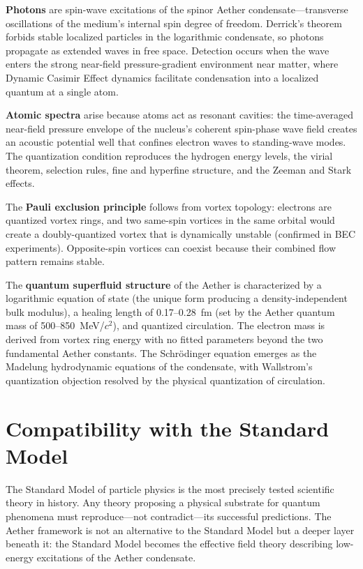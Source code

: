 \documentclass[12pt,letterpaper]{article}
\begin{document}
\textbf{Photons} are spin-wave excitations of the spinor Aether condensate---transverse
oscillations of the medium's internal spin degree of freedom.  Derrick's theorem
forbids stable localized particles in the logarithmic condensate, so photons propagate
as extended waves in free space.  Detection occurs when the wave enters the
strong near-field pressure-gradient environment near matter, where Dynamic Casimir
Effect dynamics facilitate condensation into a localized quantum at a single atom.

\textbf{Atomic spectra} arise because atoms act as resonant cavities: the time-averaged
near-field pressure envelope of the nucleus's coherent spin-phase wave field
creates an acoustic potential well that confines electron waves to standing-wave modes.
The quantization condition reproduces the hydrogen energy levels, the virial theorem,
selection rules, fine and hyperfine structure, and the Zeeman and Stark effects.

The \textbf{Pauli exclusion principle} follows from vortex topology: electrons are
quantized vortex rings, and two same-spin vortices in the same orbital would create
a doubly-quantized vortex that is dynamically unstable (confirmed in BEC experiments).
Opposite-spin vortices can coexist because their combined flow pattern remains stable.

The \textbf{quantum superfluid structure} of the Aether is characterized by a
logarithmic equation of state (the unique form producing a density-independent bulk
modulus), a healing length of 0.17--0.28~fm (set by the Aether quantum mass of
500--850~MeV/$c^2$), and quantized circulation.  The electron mass is derived from
vortex ring energy with no fitted parameters beyond the two fundamental Aether
constants.  The Schr\"odinger equation emerges as the Madelung
hydrodynamic equations of the condensate, with Wallstrom's quantization objection
resolved by the physical quantization of circulation.


\section{Compatibility with the Standard Model}

The Standard Model of particle physics is the most precisely tested scientific
theory in history.  Any theory proposing a physical substrate for quantum phenomena
must reproduce---not contradict---its successful predictions.  The Aether framework
is not an alternative to the Standard Model but a deeper layer beneath it: the
Standard Model becomes the effective field theory describing low-energy excitations
of the Aether condensate.
\end{document}

